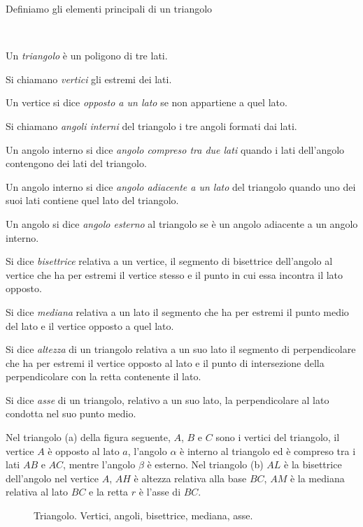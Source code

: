Definiamo gli elementi principali di un triangolo
\begin{definizione}~
\begin{itemize*}
\item Un \emph{triangolo} è un poligono di tre lati.
\item Si chiamano \emph{vertici} gli estremi dei lati.
\item Un vertice si dice \emph{opposto a un lato} se non appartiene a 
quel lato.
\item Si chiamano \emph{angoli interni} del triangolo i tre angoli 
formati dai lati.
\item Un angolo interno si dice \emph{angolo compreso tra due lati} 
quando i lati dell'angolo contengono dei lati del triangolo.
\item Un angolo interno si dice \emph{angolo adiacente a un lato} del 
triangolo quando uno dei suoi lati contiene quel lato del triangolo.
\item Un angolo si dice \emph{angolo esterno} al triangolo se è un 
angolo adiacente a un angolo interno.
\item Si dice \emph{bisettrice} relativa a un vertice, il segmento di 
bisettrice dell'angolo al vertice che ha per estremi il vertice 
stesso e il punto in cui essa incontra il lato opposto.
\item Si dice \emph{mediana} relativa a un lato il segmento che ha 
per estremi il punto medio del lato e il vertice opposto a quel lato.
\item Si dice \emph{altezza} di un triangolo relativa a un suo lato 
il segmento di perpendicolare che ha per estremi il vertice opposto 
al lato e il punto di intersezione della perpendicolare con la retta 
contenente il lato. 
\item Si dice \emph{asse} di un triangolo, relativo a un suo lato, la 
perpendicolare al lato condotta nel suo punto medio.
\end{itemize*}
\end{definizione}

Nel triangolo (a) della figura seguente, $A$, $B$ e $C$ sono i 
vertici del triangolo, il vertice $A$ è opposto al lato $a$, l'angolo 
$\alpha$ è interno al triangolo ed è compreso tra i lati $AB$ e $AC$, 
mentre l'angolo $\beta$ è esterno. Nel triangolo (b) $AL$ è la 
bisettrice dell'angolo nel vertice $A$, $AH$ è altezza relativa alla 
base $BC$, $AM$ è la mediana relativa al lato $BC$ e la retta $r$ è 
l'asse di $BC$.

\begin{inaccessibleblock}
 \begin{figure}[htb]
\centering
\caption{Triangolo. Vertici, angoli, bisettrice, mediana, asse.}
\label{fig:triangolo1}
\end{figure}
\end{inaccessibleblock}

